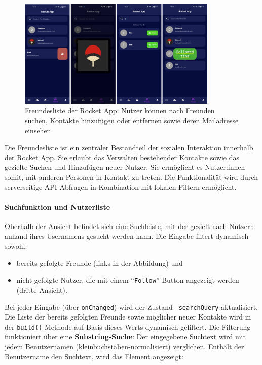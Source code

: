 \documentclass[11pt,a4paper]{article}
\begin{document}
\begin{figure}[H]
    \centering
    \includegraphics[width=0.85\textwidth]{images/apps/friendlist-pages.jpg}
    \caption{Freundesliste der Rocket App: Nutzer können nach Freunden suchen, Kontakte hinzufügen oder entfernen sowie deren Mailadresse einsehen.}
    \label{fig:validation-workflow}
\end{figure}


Die Freundesliste ist ein zentraler Bestandteil der sozialen Interaktion innerhalb der Rocket App. Sie erlaubt das Verwalten bestehender Kontakte sowie das gezielte Suchen und Hinzufügen neuer Nutzer.
Sie ermöglicht es Nutzer:innen somit, mit anderen Personen in Kontakt zu treten. Die Funktionalität wird durch serverseitige API-Abfragen in Kombination mit lokalen Filtern ermöglicht.

\paragraph{Suchfunktion und Nutzerliste}
Oberhalb der Ansicht befindet sich eine Suchleiste, mit der gezielt nach Nutzern anhand ihres Usernamens gesucht werden kann. Die Eingabe filtert dynamisch sowohl:
\begin{itemize}
    \item bereits gefolgte Freunde (links in der Abbildung) und
    \item nicht gefolgte Nutzer, die mit einem ``\texttt{Follow}''-Button angezeigt werden (dritte Ansicht).
\end{itemize}

Bei jeder Eingabe (über \texttt{onChanged}) wird der Zustand \texttt{\_searchQuery} aktualisiert. Die Liste der bereits gefolgten Freunde sowie möglicher neuer Kontakte wird in der \texttt{build()}-Methode auf Basis dieses Werts dynamisch gefiltert. Die Filterung funktioniert über eine \textbf{Substring-Suche}: Der eingegebene Suchtext wird mit jedem Benutzernamen (kleinbuchstaben-normalisiert) verglichen. Enthält der Benutzername den Suchtext, wird das Element angezeigt: 
\end{document}

